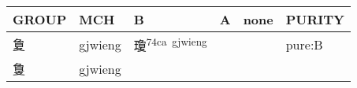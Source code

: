 \documentclass[14pt,a4paper]{scrartcl}
\begin{document}
\begin{longtable}[c]{@{}llllll@{}}
\toprule
\begin{minipage}[b]{0.14\columnwidth}\raggedright\strut
GROUP
\strut\end{minipage} &
\begin{minipage}[b]{0.14\columnwidth}\raggedright\strut
MCH
\strut\end{minipage} &
\begin{minipage}[b]{0.14\columnwidth}\raggedright\strut
B
\strut\end{minipage} &
\begin{minipage}[b]{0.14\columnwidth}\raggedright\strut
A
\strut\end{minipage} &
\begin{minipage}[b]{0.14\columnwidth}\raggedright\strut
none
\strut\end{minipage} &
\begin{minipage}[b]{0.14\columnwidth}\raggedright\strut
PURITY
\strut\end{minipage}\tabularnewline
\midrule
\endhead
\begin{minipage}[t]{0.14\columnwidth}\raggedright\strut
夐
\strut\end{minipage} &
\begin{minipage}[t]{0.14\columnwidth}\raggedright\strut
gjwieng
\strut\end{minipage} &
\begin{minipage}[t]{0.14\columnwidth}\raggedright\strut
瓊\textsuperscript{74ca~gjwieng}
\strut\end{minipage} &
\begin{minipage}[t]{0.14\columnwidth}\raggedright\strut
\strut\end{minipage} &
\begin{minipage}[t]{0.14\columnwidth}\raggedright\strut
\strut\end{minipage} &
\begin{minipage}[t]{0.14\columnwidth}\raggedright\strut
pure:B
\strut\end{minipage}\tabularnewline
\begin{minipage}[t]{0.14\columnwidth}\raggedright\strut
𢿌
\strut\end{minipage} &
\begin{minipage}[t]{0.14\columnwidth}\raggedright\strut
gjwieng
\strut\end{minipage} &
\begin{minipage}[t]{0.14\columnwidth}\raggedright\strut
\strut\end{minipage} &

\end{longtable}
\end{document}
